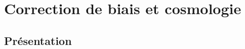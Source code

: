 \documentclass[../main/main.tex]{subfiles}
\begin{document}
% 
% 
% 

\section{Correction de biais et cosmologie}\label{sec:biais}
\subsection{Présentation}\label{ssec:bbcintro}
\end{document}
